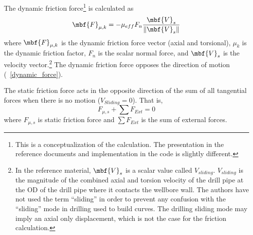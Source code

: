 The dynamic friction force\footnote{This is a conceptualization of the calculation. The presentation in the reference documents and implementation in the code is slightly different.} is calculated as
\begin{equation}\label{dynamic_force}
  \mbf{F}_{\mu,k} = - \mu_{eff} F_{n} \frac{\mbf{V}_{s}}{\|\mbf{V}_{s}\|}
\end{equation}
where $\mbf{F}_{\mu,k}$ is the dynamic friction force vector (axial and torsional), $\mu_k$ is the dynamic friction factor, $F_n$ is the scalar normal force, and $\mbf{V}_{s}$ is the velocity vector.\footnote{In the reference material, $\mbf{V}_{s}$ is a scalar value called $V_{sliding}$. $V_{sliding}$ is the magnitude of the combined axial and torsion velocity of the drill pipe at the OD of the drill pipe where it contacts the wellbore wall.  The authors have not used the term ``sliding'' in order to prevent any confusion with the ``sliding'' mode in drilling used to build curves.  The drilling sliding mode may imply an axial only displacement, which is not the case for the friction calculation.} The dynamic friction force opposes the direction of motion (\equationname~\ref{dynamic_force}).

The static friction force acts in the opposite direction of the sum of all tangential forces when there is no motion ($V_{Sliding}=0$).  That is,
\begin{equation}\label{zero}
  F_{\mu,s} + \sum F_{Ext} = 0
\end{equation}
where $F_{\mu,s}$ is static friction force and $\sum F_{Ext}$ is the sum of external forces.

%




